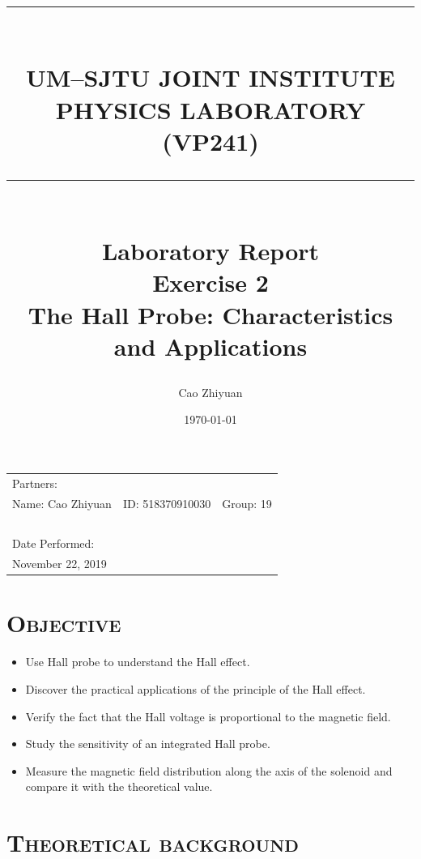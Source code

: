 \documentclass[a4paper,12pt]{article}
\title{\rule{\textwidth}{0.3mm} \\UM–SJTU JOINT INSTITUTE \\ PHYSICS LABORATORY \\ (VP241) \\ \rule{\textwidth}{0.3mm} \\ [30 mm]  \Large{Laboratory Report} \\[5 mm]  Exercise 2 \\[1 mm] 
The Hall Probe: Characteristics and Applications \\[20 mm]} %
\author{Cao Zhiyuan} %
\date{\today} %
\begin{document}
\scshape

\maketitle %

\begin{center}
\begin{tabular}{l l l}
\\[5 mm]
Partners:  \\
Name: Cao Zhiyuan & ID: 518370910030 & Group: 19 \\
~\\
Date Performed:\\
November 22, 2019\\
\end{tabular}
\end{center}

\thispagestyle{empty}


\newpage


\small\tableofcontents
\thispagestyle{empty}


\newpage

\setcounter{page}{1}
\upshape
\section{\textsc{Objective}}
\begin{itemize}
\item Use Hall probe to understand the Hall effect.
\item Discover the practical applications of the principle of the Hall effect.
\item Verify the fact that the Hall voltage is proportional to the magnetic field.
\item Study the sensitivity of an integrated Hall probe.
\item Measure the magnetic field distribution along the axis of the solenoid and compare it with the theoretical value.
\end{itemize}

\section{\textsc{Theoretical background}}
\end{document}
